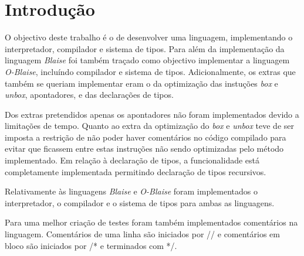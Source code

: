 \chapter{Introdução}

O objectivo deste trabalho é o de desenvolver uma linguagem, implementando o 
interpretador, compilador e sistema de tipos.
Para além da implementação da linguagem \emph{Blaise} foi também traçado como 
objectivo implementar a linguagem \emph{O-Blaise}, incluíndo compilador e 
sistema de tipos. Adicionalmente, os extras que também se queriam implementar 
eram o da optimização das instuções \emph{box} e \emph{unbox}, apontadores, e 
das declarações de tipos.

Dos extras pretendidos apenas os apontadores não foram implementados devido a 
limitações de tempo. Quanto ao extra da optimização do \emph{box} e 
\emph{unbox} teve de ser imposta a restrição de não poder haver comentários no 
código compilado para evitar que ficassem entre estas instruções não sendo 
optimizadas pelo método implementado. Em relação à declaração de tipos, a 
funcionalidade está completamente implementada permitindo declaração de tipos 
recursivos.

Relativamente às linguagens \emph{Blaise} e \emph{O-Blaise} foram implementados 
o interpretador, o compilador e o sistema de tipos para ambas as linguagens.

Para uma melhor criação de testes foram também implementados comentários na 
linguagem. Comentários de uma linha são iniciados por // e comentários em 
bloco são iniciados por /* e terminados com */.

